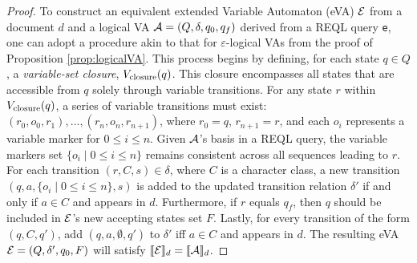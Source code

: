 \begin{proof}
	To construct an equivalent extended Variable Automaton (eVA) $\mathcal{E}$ from a
	document $d$ and a logical VA $\mathcal{A} = (Q, \delta, q_0, q_f)$ derived from a
	REQL query \texttt{e}, one can adopt a procedure akin to that for
	$\varepsilon$-logical VAs from the proof of Proposition
	\ref{prop:logicalVA}. This process begins by defining, for each state $q \in
	Q$, a \emph{variable-set closure}, $V_{\text{closure}}(q)$. This closure encompasses
	all states that are accessible from $q$ solely through variable transitions.
	For any state $r$ within $V_{\text{closure}}(q)$, a series of variable transitions
	must exist: $(r_0, o_0, r_1), \ldots, (r_n, o_n, r_{n+1})$, where $r_0 = q$,
	$r_{n+1} = r$, and each $o_i$ represents a variable marker for $0 \leq i
	\leq n$. Given $\mathcal{A}$'s basis in a REQL query, the variable markers set
	$\{o_i \mid 0 \leq i \leq n\}$ remains consistent across all sequences
	leading to $r$. For each transition $(r, C, s) \in \delta$, where $C$ is a
	character class, a new transition $(q, a, \{o_i \mid 0 \leq i \leq n\}, s)$
	is added to the updated transition relation $\delta'$ if and only if $a \in
	C$ and appears in $d$. Furthermore, if $r$ equals $q_f$, then $q$ should be
	included in $\mathcal{E}$'s new accepting states set $F$. Lastly, for every
	transition of the form $(q, C, q')$, add $(q, a, \emptyset, q')$ to
	$\delta'$ iff $a \in C$ and appears in $d$. The resulting eVA $\mathcal{E} = (Q,
	\delta', q_0, F)$ will satisfy $\llbracket\mathcal{E}\rrbracket_d = \llbracket\mathcal{A}\rrbracket_d$.
\end{proof}


